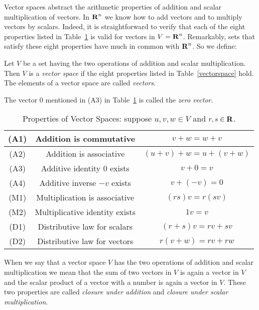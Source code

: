  \label{S:5.1}

Vector spaces abstract the arithmetic properties of addition and
scalar multiplication of vectors.  In $\mbox{$\bf{R}$}^n$ we know how to add
vectors and to multiply vectors by scalars.  Indeed, it is
straightforward to verify that each of the eight
properties listed in Table~\ref{vectorspacelist} is valid for
vectors in $V=\mbox{$\bf{R}$}^n$.  Remarkably, sets that satisfy these eight
properties have much in common with $\mbox{$\bf{R}$}^n$.  So we define:
\begin{Def}  \label{vectorspace}
Let $V$ be a set having the two operations of addition and scalar
multiplication.  Then $V$ is a {\em vector space\/} if the eight
properties listed in Table~\ref{vectorspace} hold.  The elements
of a vector space are called {\em vectors}.
\end{Def} 

The vector $0$ mentioned in (A3) in Table~\ref{vectorspacelist}
is called the {\em zero vector}.

\begin{table}
\caption{Properties of Vector Spaces: suppose $u,v,w\in V$ and
$r,s\in\mbox{$\bf{R}$}$.}
\begin{center}
\begin{tabular}{|c|c|c|}
\hline
(A1) & Addition is commutative & $v+w=w+v$ \\
\hline
(A2) & Addition is associative & $(u+v)+w = u+(v+w)$ \\
\hline
(A3) & Additive identity $0$ exists & $v+0=v$ \\
\hline
(A4) & Additive inverse $-v$ exists & $v+(-v) = 0$ \\
\hline
(M1) & Multiplication is associative & $(rs)v = r(sv)$ \\
\hline
(M2) & Multiplicative identity exists & $1v=v$ \\
\hline
(D1) & Distributive law for scalars & $(r+s)v = rv+sv$ \\
\hline
(D2) & Distributive law for vectors & $r(v+w) = rv+rw$ \\
\hline
\end{tabular}
\end{center}  
 
 
\label{vectorspacelist}
\end{table}

When we say that a vector space $V$ has the two operations of
addition and scalar multiplication we mean that the sum of two
vectors in $V$ is again a vector in $V$ and the scalar product
of a vector with a number is again a vector in $V$.  These two
properties are called {\em closure under addition\/} and
{\em closure under scalar multiplication}.

